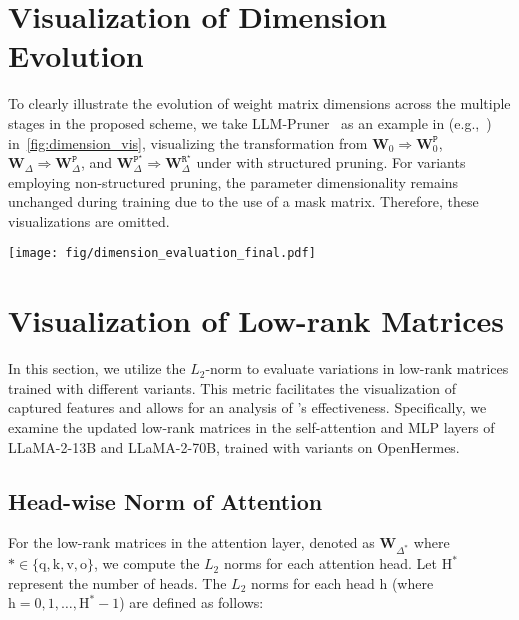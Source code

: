 \clearpage
\section{Visualization of Dimension Evolution}
\label{sec:dimension_vis}
To clearly illustrate the evolution of weight matrix dimensions across the multiple stages in the proposed scheme, we take LLM-Pruner~\citep{ma2023llmpruner} as an example in (e.g.,~\methodstru) in~\cref{fig:dimension_vis}, visualizing the transformation from $\mathbf{W}_{0} \Rightarrow \mathbf{W}_{0}^\mathtt{P}$, $\mathbf{W}_{\Delta} \Rightarrow \mathbf{W}_{\Delta}^\mathtt{P}$, and $\mathbf{W}_{\Delta}^{\mathtt{P}^{\star}}\Rightarrow \mathbf{W}_{\Delta}^{\mathtt{R}^{\star}}$ under \method with structured pruning. 
For \method variants employing non-structured pruning, the parameter dimensionality remains unchanged during training due to the use of a mask matrix. Therefore, these visualizations are omitted.
\begin{figure*}[ht]
\begin{center}
\texttt{[image: fig/dimension\_evaluation\_final.pdf]}
\caption{
Dimensional evolution of the weight matrices: $\mathbf{W}_{0} \Rightarrow \mathbf{W}_{0}^\mathtt{P}$ (a), $\mathbf{W}_{\Delta} \Rightarrow \mathbf{W}_{\Delta}^\mathtt{P}$ (b), and $\mathbf{W}_{\Delta}^{\mathtt{P}^{\star}} \Rightarrow \mathbf{W}_{\Delta}^{\mathtt{R}^{\star}}$ (c) during \methodstru training. This includes updates for $\mathbf{W}_\text{q}$, $\mathbf{W}_\text{k}$, $\mathbf{W}_\text{v}$, and $\mathbf{W}_\text{o}$ in the attention layer, as well as $\mathbf{W}_\text{up}$, $\mathbf{W}_\text{gate}$, and $\mathbf{W}_\text{down}$ in the MLP layer.
}
\label{fig:dimension_vis}
\end{center}
\end{figure*}


\clearpage
\section{Visualization of Low-rank Matrices}
\label{apd:vis_matrix}
In this section, we utilize the \(L_{2}\)-norm to evaluate variations in low-rank matrices trained with different \method variants. This metric facilitates the visualization of captured features and allows for an analysis of \method's effectiveness. Specifically, we examine the updated low-rank matrices in the self-attention and MLP layers of LLaMA-2-13B and LLaMA-2-70B, trained with \method variants on OpenHermes.

\subsection{Head-wise Norm of Attention}
For the low-rank matrices in the attention layer, denoted as \(\mathbf{W}_{\Delta^{*}}\) where \({*} \in \{\text{q}, \text{k}, \text{v}, \text{o}\}\), we compute the \(L_{2}\) norms for each attention head. Let \(\text{H}^{*}\) represent the number of heads. The \(L_{2}\) norms for each head \(\text{h}\) (where \(\text{h} = 0, 1, \ldots, \text{H}^{*} - 1\)) are defined as follows:

